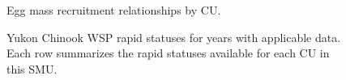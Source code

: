 \documentclass[11pt]{book}
\begin{document}
\begin{figure}[htb]

{\centering {} 

}

\caption{Egg mass recruitment relationships by CU.}\label{fig:fig-demo-smsr}
\end{figure}

\begin{figure}[htb]

{\centering {} 

}

\caption{Yukon Chinook WSP rapid statuses for years with applicable data. Each row summarizes the rapid statuses available for each CU in this SMU.}\label{fig:fig-rapid-status}
\end{figure}
\end{document}
